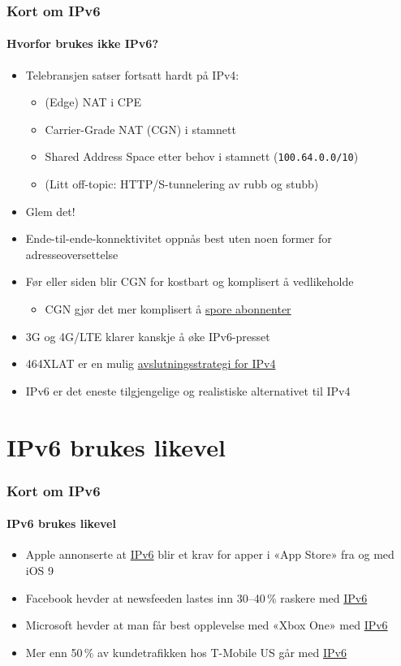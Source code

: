 \begin{frame}
  \frametitle{Kort om IPv6}
  \framesubtitle{Hvorfor brukes ikke IPv6?}
  \begin{itemize}
  \item Telebransjen satser fortsatt hardt på IPv4:
    \begin{itemize}
    \item (Edge) NAT i CPE\hfill{}
    \item Carrier-Grade NAT (CGN) i stamnett\hfill{}
    \item Shared Address Space etter behov i stamnett (\texttt{100.64.0.0/10})\hfill{}
    \item (Litt off-topic: HTTP/S-tunnelering av rubb og stubb)
    \end{itemize}
  \item Glem det!
  \item Ende-til-ende-konnektivitet oppnås best uten noen former for
    adresseoversettelse
  \item Før eller siden blir CGN for kostbart og komplisert å vedlikeholde
    \begin{itemize}
    \item CGN gjør det mer komplisert å
      \href{http://www.nyteknik.se/nyheter/it_telekom/allmant/article3904264.ece}{spore
        abonnenter}
    \end{itemize}
  \item 3G og 4G/LTE klarer kanskje å øke IPv6-presset\hfill{}
  \item 464XLAT er en mulig
    \href{https://conference.apnic.net/data/37/464xlat-apricot-2014_1393236641.pdf}{avslutningsstrategi
      for IPv4}\hfill{}
  \item \alert<2>{IPv6 er det eneste tilgjengelige og realistiske alternativet til IPv4}
  \end{itemize}
\end{frame}

\section{IPv6 brukes likevel}
\begin{frame}
  \frametitle{Kort om IPv6}
  \framesubtitle{IPv6 brukes likevel}
  \begin{itemize}
  \item Apple annonserte at
    \href{https://developer.apple.com/videos/wwdc/2015/?id=102}{IPv6}
    blir et krav for apper i «App Store» fra og med iOS 9
  \item Facebook hevder at newsfeeden lastes inn 30--40\,\% raskere
    med
    \href{https://www.youtube.com/watch?v=An7s25FSK0U&feature=youtu.be&t=18m54s}{IPv6}
  \item Microsoft hevder at man får best opplevelse med «Xbox One» med
    \href{http://www.internetsociety.org/deploy360/blog/2013/10/microsoft-the-best-xbox-one-gaming-experience-will-be-over-ipv6/}{IPv6}
  \item Mer enn 50\,\% av kundetrafikken hos T-Mobile US går med
    \href{https://conference.apnic.net/data/37/464xlat-apricot-2014_1393236641.pdf}{IPv6}
  \end{itemize}
\end{frame}

